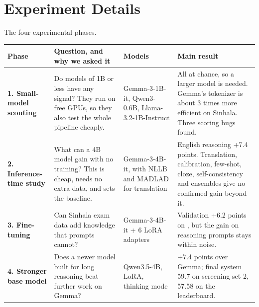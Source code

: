 \section{Experiment Details}\label{app:details}

\begin{center}\captionsetup{type=table}
\footnotesize
\caption{The four experimental phases.}\label{tab:phases}
\begin{tabularx}{\textwidth}{@{}L{0.14\textwidth}L{0.3\textwidth}L{0.2\textwidth}Y@{}}
\toprule
Phase & Question, and why we asked it & Models & Main result \\
\midrule
\textbf{1. Small-model scouting} & Do models of 1B or less have any signal? They run on free GPUs, so they also test the whole pipeline cheaply. & Gemma-3-1B-it, Qwen3-0.6B, Llama-3.2-1B-Instruct & All at chance, so a larger model is needed. Gemma's tokenizer is about 3 times more efficient on Sinhala. Three scoring bugs found. \\
\textbf{2. Inference-time study} & What can a 4B model gain with no training? This is cheap, needs no extra data, and sets the baseline. & Gemma-3-4B-it, with NLLB and MADLAD for translation & English reasoning +7.4 points. Translation, calibration, few-shot, cloze, self-consistency and ensembles give no confirmed gain beyond it. \\
\textbf{3. Fine-tuning} & Can Sinhala exam data add knowledge that prompts cannot? & Gemma-3-4B-it + 6 LoRA adapters & Validation +6.2 points on \sinmulu{}, but the gain on reasoning prompts stays within noise. \\
\textbf{4. Stronger base model} & Does a newer model built for long reasoning beat further work on Gemma? & Qwen3.5-4B, LoRA, thinking mode & +7.4 points over Gemma; final system 59.7 on screening set 2, 57.58 on the leaderboard. \\
\bottomrule
\end{tabularx}
\end{center}


